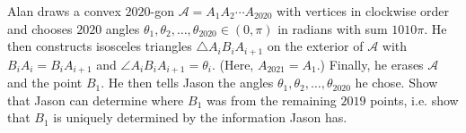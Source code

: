 Alan draws a convex $2020$-gon $\mathcal{A}=A_1A_2\dotsm A_{2020}$ with vertices in clockwise order and chooses $2020$ angles $\theta_1, \theta_2, \dotsc, \theta_{2020}\in (0, \pi)$ in radians with sum $1010\pi$. He then constructs isosceles triangles $\triangle A_iB_iA_{i+1}$ on the exterior of $\mathcal{A}$ with $B_iA_i=B_iA_{i+1}$ and $\angle A_iB_iA_{i+1}=\theta_i$. (Here, $A_{2021}=A_1$.) Finally, he erases $\mathcal{A}$ and the point $B_1$. He then tells Jason the angles $\theta_1, \theta_2, \dotsc, \theta_{2020}$ he chose. Show that Jason can determine where $B_1$ was from the remaining $2019$ points, i.e. show that $B_1$ is uniquely determined by the information Jason has.